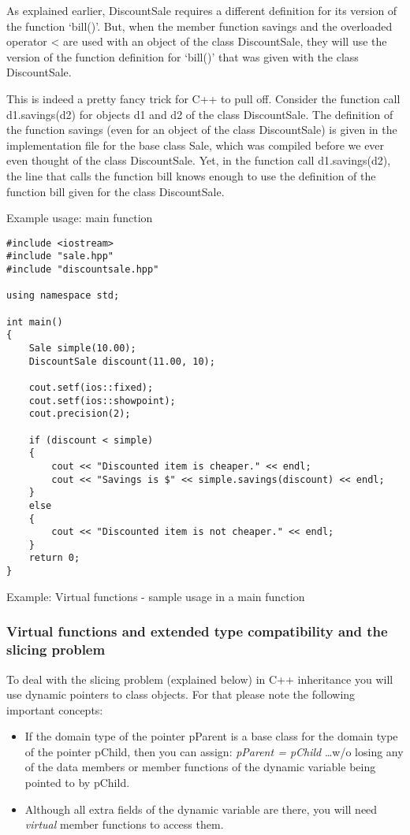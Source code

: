 As explained earlier, DiscountSale requires a different definition for its version of the function
`bill()'. But, when the member function savings and the overloaded operator < are used with
an object of the class DiscountSale, they will use the version of the function definition for
`bill()' that was given with the class DiscountSale.

This is indeed a pretty fancy trick for C++ to pull off. Consider the function call d1.savings(d2)
for objects d1 and d2 of the class DiscountSale. The definition of the function savings (even for
an object of the class DiscountSale) is given in the implementation file for the base class Sale,
which was compiled before we ever even thought of the class DiscountSale. Yet, in the function
call d1.savings(d2), the line that calls the function bill knows enough to use the definition of the
function bill given for the class DiscountSale.


\noindent
Example usage: main function
\begin{listing}[H]
\begin{verbatim}
#include <iostream>
#include "sale.hpp"
#include "discountsale.hpp"

using namespace std;

int main()
{
	Sale simple(10.00);
	DiscountSale discount(11.00, 10);
	
	cout.setf(ios::fixed);
	cout.setf(ios::showpoint);
	cout.precision(2);

	if (discount < simple)
	{
		cout << "Discounted item is cheaper." << endl;
		cout << "Savings is $" << simple.savings(discount) << endl;
	}
	else
	{
		cout << "Discounted item is not cheaper." << endl;
	}
	return 0;
}
\end{verbatim}
\caption{Example: Virtual functions - sample usage in a main function}
\label{source_code_1}
\end{listing}




\subsubsection*{Virtual functions and extended type compatibility and the slicing problem}
To deal with the slicing problem (explained below) in C++ inheritance you will use dynamic
pointers to class objects. For that please note the following important concepts:

\begin{itemize}
	\item If the domain type of the pointer pParent is a base class for the domain type of
	the pointer pChild, then you can assign: \emph{pParent = pChild} \ldots w/o losing any
	of the data members or member functions of the dynamic variable being pointed to by
	pChild.
	\item Although all extra fields of the dynamic variable are there, you will need
	\emph{virtual} member functions to access them.
\end{itemize}


